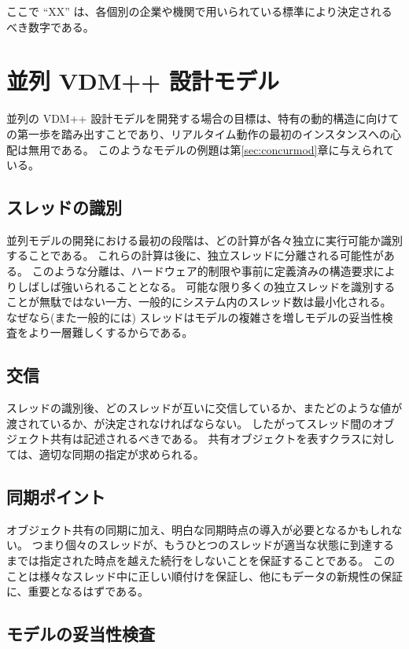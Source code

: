 \documentclass[\pformat,12pt]{jreport}
\begin{document}
ここで ``XX'' は、各個別の企業や機関で用いられている標準により決定されるべき数字である。

\section{並列 VDM++ 設計モデル}\label{sec:concur}
並列の VDM++ 設計モデルを開発する場合の目標は、特有の動的構造に向けての第一歩を踏み出すことであり、リアルタイム動作の最初のインスタンスへの心配は無用である。
このようなモデルの例題は第\ref{sec:concurmod}章に与えられている。

\subsection{スレッドの識別}

並列モデルの開発における最初の段階は、どの計算が各々独立に実行可能か識別することである。
これらの計算は後に、独立スレッドに分離される可能性がある。
このような分離は、ハードウェア的制限や事前に定義済みの構造要求によりしばしば強いられることとなる。
可能な限り多くの独立スレッドを識別することが無駄ではない一方、一般的にシステム内のスレッド数は最小化される。
なぜなら(また一般的には) スレッドはモデルの複雑さを増しモデルの妥当性検査をより一層難しくするからである。

\subsection{交信}

スレッドの識別後、どのスレッドが互いに交信しているか、またどのような値が渡されているか、が決定されなければならない。
したがってスレッド間のオブジェクト共有は記述されるべきである。
共有オブジェクトを表すクラスに対しては、適切な同期の指定が求められる。

\subsection{同期ポイント}

オブジェクト共有の同期に加え、明白な同期時点の導入が必要となるかもしれない。
つまり個々のスレッドが、もうひとつのスレッドが適当な状態に到達するまでは指定された時点を越えた続行をしないことを保証することである。
このことは様々なスレッド中に正しい順付けを保証し、他にもデータの新規性の保証に、重要となるはずである。

\subsection{モデルの妥当性検査}
\end{document}
